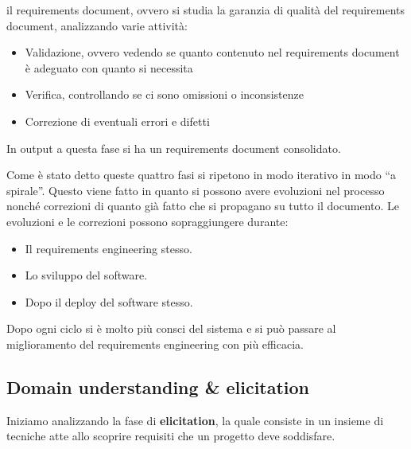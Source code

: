 \begin{enumerate}
            il requirements document, ovvero si studia la garanzia di qualità del
            requirements document, analizzando varie attività:
            \begin{itemize}
                  \item Validazione, ovvero vedendo se quanto contenuto nel requirements
                        document è adeguato con quanto si necessita
                  \item Verifica, controllando se ci sono omissioni o inconsistenze
                  \item Correzione di eventuali errori e difetti
            \end{itemize}
            In output a questa fase si ha un requirements document consolidato.
\end{enumerate}

Come è stato detto queste quattro fasi si ripetono in modo iterativo in modo “a
spirale”. Questo viene fatto in quanto si possono avere evoluzioni nel processo
nonché correzioni di quanto già fatto che si propagano su tutto il documento. Le
evoluzioni e le correzioni possono sopraggiungere durante:
\begin{itemize}
      \item Il requirements engineering stesso.
      \item Lo sviluppo del software.
      \item Dopo il deploy del software stesso.
\end{itemize}
Dopo ogni ciclo si è molto più consci del sistema e si può passare al miglioramento
del requirements engineering con più efficacia.
\subsection{Domain understanding \& elicitation}
Iniziamo analizzando la fase di \textbf{elicitation}, la quale consiste in un
insieme di tecniche atte allo scoprire requisiti che un progetto deve soddisfare.
